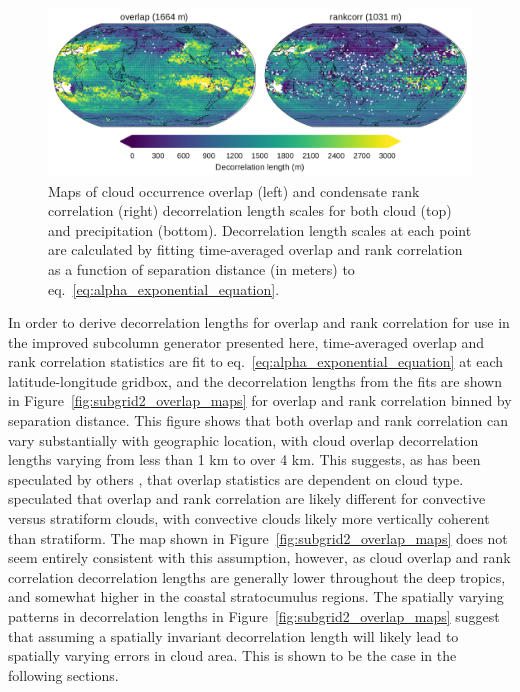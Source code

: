 \begin{figure}[htbp]
\centering
\includegraphics{graphics/subgrid2_overlap_maps.pdf}
\caption{\label{fig:subgrid2_overlap_maps}Maps of cloud occurrence
overlap (left) and condensate rank correlation (right) decorrelation
length scales for both cloud (top) and precipitation (bottom).
Decorrelation length scales at each point are calculated by fitting
time-averaged overlap and rank correlation as a function of separation
distance (in meters) to
eq.~\ref{eq:alpha_exponential_equation}.}\label{fig:subgrid2ux5foverlapux5fmaps}
\end{figure}

In order to derive decorrelation lengths for overlap and rank
correlation for use in the improved subcolumn generator presented here,
time-averaged overlap and rank correlation statistics are fit to
eq.~\ref{eq:alpha_exponential_equation} at each latitude-longitude
gridbox, and the decorrelation lengths from the fits are shown in
Figure~\ref{fig:subgrid2_overlap_maps} for overlap and rank correlation
binned by separation distance. This figure shows that both overlap and
rank correlation can vary substantially with geographic location, with
cloud overlap decorrelation lengths varying from less than 1 km to over
4 km. This suggests, as has been speculated by others \citep[
e.g.]{pincus_et_al_2005}, that overlap statistics are dependent on cloud
type. \citet{pincus_et_al_2005} speculated that overlap and rank
correlation are likely different for convective versus stratiform
clouds, with convective clouds likely more vertically coherent than
stratiform. The map shown in Figure~\ref{fig:subgrid2_overlap_maps} does
not seem entirely consistent with this assumption, however, as cloud
overlap and rank correlation decorrelation lengths are generally lower
throughout the deep tropics, and somewhat higher in the coastal
stratocumulus regions. The spatially varying patterns in decorrelation
lengths in Figure~\ref{fig:subgrid2_overlap_maps} suggest that assuming
a spatially invariant decorrelation length will likely lead to spatially
varying errors in cloud area. This is shown to be the case in the
following sections.


